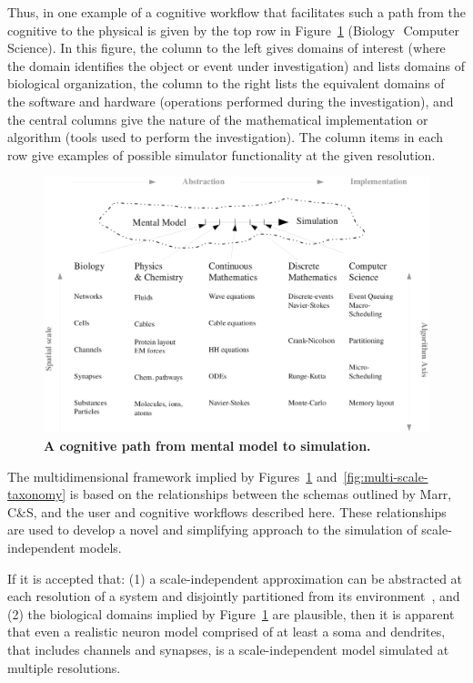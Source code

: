 \documentclass{article}
\begin{document}
Thus, in one example of a cognitive workflow that facilitates such a path from the cognitive to the physical is given by the top row in Figure~\ref{fig:mental-model-simulation-path} (Biology \textrightarrow\,\,Computer Science).  In this figure, the column to the left gives domains of interest (where the domain identifies the object or event under investigation) and lists domains of biological organization, the column to the right lists the equivalent domains of the software and hardware (operations performed during the investigation), and the central columns give the nature of the mathematical implementation or algorithm (tools used to perform the investigation).  The column items in each row give examples of possible simulator functionality at the given resolution.

\begin{figure}[h!t]
  \begin{center}
    \includegraphics[width=5in]{figures/NS-abstraction-implementation.eps}
  \end{center}
  \caption{ {\bf A cognitive path from mental model to simulation.} }
  \label{fig:mental-model-simulation-path}
\end{figure}

The multidimensional framework implied by Figures~\ref{fig:mental-model-simulation-path} and~\ref{fig:multi-scale-taxonomy} is based on the relationships between the schemas outlined by Marr, C\&S, and the user and cognitive workflows described here. These relationships are used to develop a novel and simplifying approach to the simulation of scale-independent models.



If it is accepted that: (1) a scale-independent approximation can be abstracted at each resolution of a system and disjointly partitioned from its environment~\cite{Bertalanffy:1973zr, Heylighen:2006vn}, and (2) the biological domains implied by Figure~\ref{fig:mental-model-simulation-path} are plausible, then it is apparent that even a realistic neuron model comprised of at least a soma and dendrites, that includes channels and synapses, is a scale-independent model simulated at multiple resolutions.
\end{document}
